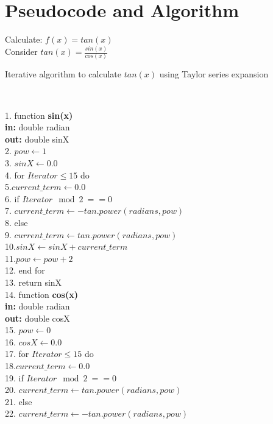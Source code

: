 \documentclass[a4paper, 11pt]{article}
\begin{document}
\section*{Pseudocode and Algorithm}
Calculate: $f(x) = tan(x)$ \\[0.5 cm]
Consider $tan(x) = \frac{sin(x)}{cos(x)}$
\begin{algorithm}
\caption{Iterative algorithm to calculate $tan(x)$ using Taylor series expansion}\\

\begin{algorithmic} 
1. function \textbf{sin(x)}\\
\textbf{in: } double radian\\
\textbf{out: } double sinX\\
2. \STATE $pow \leftarrow 1$\\
3. \STATE $sinX \leftarrow 0.0$\\
4. for {$Iterator \leq 15$} do\\
5.\qquad \STATE $current\_term \leftarrow 0.0$\\
6. \qquad \STATE if {$Iterator\mod 2 \ == 0$}\\
7. \qquad \STATE $current\_term  \leftarrow -tan.power(radians, pow)$\\
8. \qquad \STATE else\\
9. \qquad \STATE $current\_term  \leftarrow tan.power(radians, pow)$\\
10.\qquad \STATE $sinX \leftarrow sinX+current\_term$\\
11.\qquad \STATE $pow \leftarrow pow+2$\\
12. end for\\
13. \STATE return sinX \\
14. function \textbf{cos(x)}\\
\textbf{in: } double radian\\
\textbf{out: } double cosX\\
15. \STATE $pow \leftarrow 0$\\
16. \STATE $cosX \leftarrow 0.0$\\
17. for {$Iterator \leq 15$} do\\
18.\qquad \STATE $current\_term \leftarrow 0.0$\\
19. \qquad \STATE if {$Iterator\mod 2 \ == 0$}\\
20. \qquad \STATE $current\_term  \leftarrow tan.power(radians, pow)$\\
21. \qquad \STATE else\\
22. \qquad \STATE $current\_term  \leftarrow -tan.power(radians, pow)$\\

\end{algorithmic}
\end{algorithm}
\end{document}
